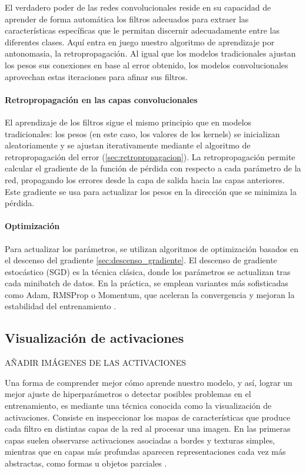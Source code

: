 El verdadero poder de las redes convolucionales reside en su capacidad de aprender de forma automática los filtros adecuados para extraer las características específicas que le permitan discernir adecuadamente entre las diferentes clases. Aquí entra en juego nuestro algoritmo de aprendizaje por antonomasia, la retropropagación. Al igual que los modelos tradicionales ajustan los pesos sus conexiones en base al error obtenido, los modelos convolucionales aprovechan estas iteraciones para afinar sus filtros.

\paragraph{Retropropagación en las capas convolucionales}

El aprendizaje de los filtros sigue el mismo principio que en modelos tradicionales: los pesos (en este caso, los valores de los kernels) se inicializan aleatoriamente y se ajustan iterativamente mediante el algoritmo de retropropagación del error (\ref{sec:retropropagacion}).
La retropropagación permite calcular el gradiente de la función de pérdida con respecto a cada parámetro de la red, propagando los errores desde la capa de salida hacia las capas anteriores. Este gradiente se usa para actualizar los pesos en la dirección que se minimiza la pérdida.

\paragraph{Optimización}

Para actualizar los parámetros, se utilizan algoritmos de optimización basados en el descenso del gradiente \ref{sec:descenso_gradiente}. El descenso de gradiente estocástico (SGD) es la técnica clásica, donde los parámetros se actualizan tras cada minibatch de datos.
En la práctica, se emplean variantes más sofisticadas como Adam, RMSProp o Momentum, que aceleran la convergencia y mejoran la estabilidad del entrenamiento \cite{dl_python__chollet_2021}.



\subsection{Visualización de activaciones}

{\color{red} AÑADIR IMÁGENES DE LAS ACTIVACIONES}

Una forma de comprender mejor cómo aprende nuestro modelo, y así, lograr un mejor ajuste de hiperparámetros o detectar posibles problemas en el entrenamiento, es mediante una técnica conocida como la visualización de activaciones. Consiste en inspeccionar los mapas de características que produce cada filtro en distintas capas de la red al procesar una imagen.
En las primeras capas suelen observarse activaciones asociadas a bordes y texturas simples, mientras que en capas más profundas aparecen representaciones cada vez más abstractas, como formas u objetos parciales \cite{dl_python__chollet_2021}.


